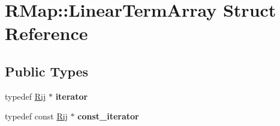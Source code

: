 \hypertarget{structRMap_1_1LinearTermArray}{}\section{R\+Map\+:\+:Linear\+Term\+Array Struct Reference}
\label{structRMap_1_1LinearTermArray}
\subsection*{Public Types}
\begin{DoxyCompactItemize}
\item 
\mbox{\label{structRMap_1_1LinearTermArray_acce58bd2d8723a73e04ca2899404a82d}} 
typedef \hyperlink{structRMap_1_1Rij}{Rij} $\ast$ {\bfseries iterator}
\item 
\mbox{\label{structRMap_1_1LinearTermArray_a3f0fa103626e74b87346d37b725c3e82}} 
typedef const \hyperlink{structRMap_1_1Rij}{Rij} $\ast$ {\bfseries const\+\_\+iterator}
\end{DoxyCompactItemize}
